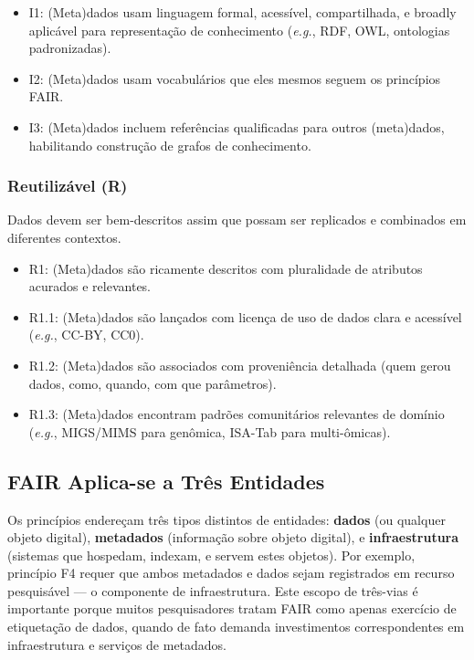 \begin{itemize}
\item I1: (Meta)dados usam linguagem formal, acessível, compartilhada, e broadly aplicável para representação de conhecimento (\textit{e.g.}, RDF, OWL, ontologias padronizadas).
\item I2: (Meta)dados usam vocabulários que eles mesmos seguem os princípios FAIR.
\item I3: (Meta)dados incluem referências qualificadas para outros (meta)dados, habilitando construção de grafos de conhecimento.
\end{itemize}

\subsubsection{Reutilizável (R)}

Dados devem ser bem-descritos assim que possam ser replicados e combinados em diferentes contextos.

\begin{itemize}
\item R1: (Meta)dados são ricamente descritos com pluralidade de atributos acurados e relevantes.
\item R1.1: (Meta)dados são lançados com licença de uso de dados clara e acessível (\textit{e.g.}, CC-BY, CC0).
\item R1.2: (Meta)dados são associados com proveniência detalhada (quem gerou dados, como, quando, com que parâmetros).
\item R1.3: (Meta)dados encontram padrões comunitários relevantes de domínio (\textit{e.g.}, MIGS/MIMS para genômica, ISA-Tab para multi-ômicas).
\end{itemize}

\subsection{FAIR Aplica-se a Três Entidades}

Os princípios endereçam três tipos distintos de entidades: \textbf{dados} (ou qualquer objeto digital), \textbf{metadados} (informação sobre objeto digital), e \textbf{infraestrutura} (sistemas que hospedam, indexam, e servem estes objetos). Por exemplo, princípio F4 requer que ambos metadados e dados sejam registrados em recurso pesquisável --- o componente de infraestrutura. Este escopo de três-vias é importante porque muitos pesquisadores tratam FAIR como apenas exercício de etiquetação de dados, quando de fato demanda investimentos correspondentes em infraestrutura e serviços de metadados.

